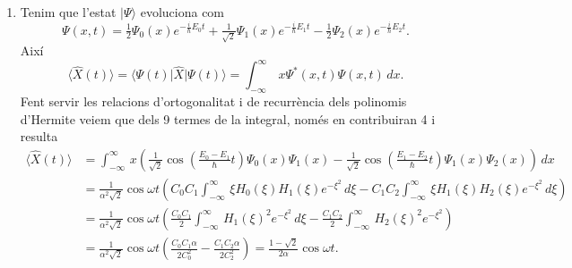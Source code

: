\documentclass[12pt]{article}
\numberwithin{table}{section}
\numberwithin{figure}{section}
\numberwithin{equation}{section}
\newcommand{\ket}[1]{\vert #1 \rangle}
\newcommand{\bra}[1]{\langle #1 \vert}
\begin{document}
\begin{enumerate}[label=(\alph*), font=\bfseries \sffamily, wide, labelwidth=!, labelindent=0pt]
	\item Tenim que l'estat \( \ket{\Psi} \) evoluciona com
		\begin{equation*}
			\Psi(x,t) = \tfrac{1}{2}\Psi_0(x)e^{-\frac{i}{\hbar}E_0 t} + \tfrac{1}{\sqrt{2}}\Psi_1(x)e^{-\frac{i}{\hbar}E_1 t} - \tfrac{1}{2}\Psi_2(x)e^{-\frac{i}{\hbar}E_2 t}. 
		\end{equation*}
Així
\begin{equation*}
	\langle \hat{X}(t) \rangle = \bra{\Psi(t)} \hat{X} \ket{\Psi(t)} = \int_{-\infty}^{\infty}\, x \Psi^\ast(x,t) \Psi(x,t) \,dx. 
\end{equation*}	
Fent servir les relacions d'ortogonalitat i de recurrència dels polinomis d'Hermite veiem que dels 9 termes de la integral, només en contribuiran 4 i resulta
\begin{align*}
	\langle \hat{X}(t) \rangle & = \int_{-\infty}^{\infty}\, x \left(\tfrac{1}{\sqrt{2}}\cos{\left(\tfrac{E_0 - E_1}{\hbar}t\right)}\Psi_0(x)\Psi_1(x) - \tfrac{1}{\sqrt{2}}\cos{\left(\tfrac{E_1 - E_2}{\hbar}t\right)}\Psi_1(x)\Psi_2(x)\right) \,dx \\
														 & = \tfrac{1}{\alpha^2 \sqrt{2}}\cos{\omega t} \left(C_0 C_1 \int_{-\infty}^{\infty} \, \xi H_0(\xi)H_1(\xi) e^{-\xi^2} \,d\xi - C_1 C_2 \int_{-\infty}^{\infty} \, \xi H_1(\xi)H_2(\xi) e^{-\xi^2} \,d\xi \right) \\
														 & = \tfrac{1}{\alpha^2 \sqrt{2}}\cos{\omega t} \left(\frac{C_0C_1}{2}\int_{-\infty}^{\infty} \, H_1(\xi)^2 e^{-\xi^2} \, d\xi - \frac{C_1C_2}{2}\int_{-\infty}^{\infty} \, H_2(\xi)^2 e^{-\xi^2} \right) \\
														 & = \tfrac{1}{\alpha^2 \sqrt{2}}\cos{\omega t} \left(\frac{C_0C_1\alpha}{2C_0^2} - \frac{C_1C_2\alpha}{2C_2^2}\right) = \frac{1 - \sqrt{2}}{2\alpha} \cos{\omega t}.
\end{align*}


\end{enumerate}
\end{document}
